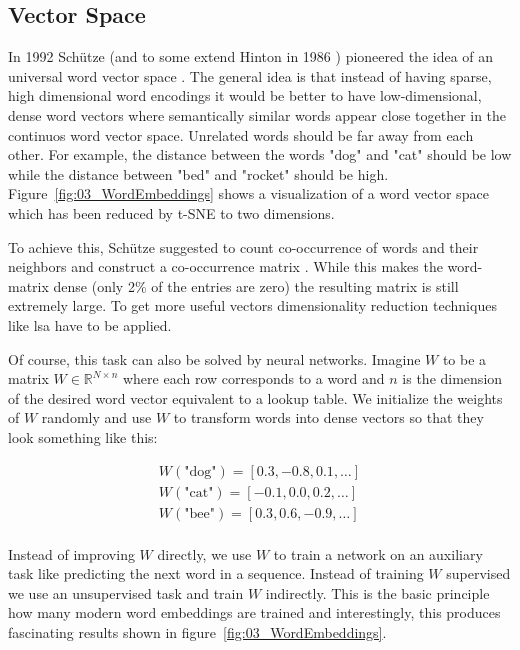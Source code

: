 \subsection{Vector Space}
\label{sec:03_vectorSpace}

In 1992 Schütze {(and to some extend Hinton in 1986 \cite{Hinton1986})} pioneered the idea of an universal word vector space \cite{Schutze1992}. The general idea is that instead of having sparse, high dimensional word encodings it would be better to have low-dimensional, dense word vectors where semantically similar words appear close together in the continuos word vector space. Unrelated words should be far away from each other. For example, the distance between the words "dog" and "cat" should be low while the distance between "bed" and "rocket" should be high. Figure~\ref{fig:03_WordEmbeddings} shows a visualization of a word vector space which has been reduced by t-SNE to two dimensions.
\medskip

To achieve this, Schütze suggested to count co-occurrence of words and their neighbors and construct a co-occurrence matrix \cite{Schutze1992}. While this makes the word-matrix dense {(only 2\% of the entries are zero)} the resulting matrix is still extremely large. To get more useful vectors dimensionality reduction techniques like \gls{lsa} have to be applied.
\medskip

Of course, this task can also be solved by neural networks. Imagine $W$ to be a matrix $W \in \mathbb{R}^{N\times n}$ where each row corresponds to a word and $n$ is the dimension of the desired word vector equivalent to a lookup table. We initialize the weights of $W$ randomly and use $W$ to transform words into dense vectors so that they look something like this:

\begin{equation*}
	\begin{aligned}
		W(\text{"dog"}) = [0.3, -0.8, 0.1, \dots] \\
		W(\text{"cat"}) = [-0.1, 0.0, 0.2, \dots] \\
		W(\text{"bee"}) = [0.3, 0.6, -0.9, \dots] \\
	\end{aligned}
\end{equation*}

Instead of improving $W$ directly, we use $W$ to train a network on an auxiliary task like predicting the next word in a sequence. Instead of training $W$ supervised we use an unsupervised task and train $W$ indirectly. This is the basic principle how many modern word embeddings are trained and interestingly, this produces fascinating results shown in figure~\ref{fig:03_WordEmbeddings}.
\medskip

